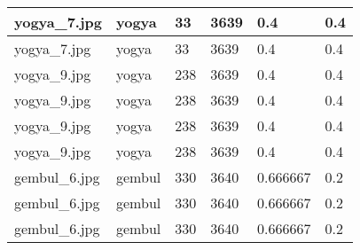 \begin{table}[H]
\begin{tabular}{|l|l|l|l|l|l|}
		yogya\_7.jpg                       & yogya                                    & 33                                           & 3639                                         & 0.4                                      & 0.4                                       \\ \hline
		yogya\_7.jpg                       & yogya                                    & 33                                           & 3639                                         & 0.4                                      & 0.4                                       \\ \hline
		yogya\_9.jpg                       & yogya                                    & 238                                          & 3639                                         & 0.4                                      & 0.4                                       \\ \hline
		yogya\_9.jpg                       & yogya                                    & 238                                          & 3639                                         & 0.4                                      & 0.4                                       \\ \hline
		yogya\_9.jpg                       & yogya                                    & 238                                          & 3639                                         & 0.4                                      & 0.4                                       \\ \hline
		yogya\_9.jpg                       & yogya                                    & 238                                          & 3639                                         & 0.4                                      & 0.4                                       \\ \hline
		gembul\_6.jpg                      & gembul                                   & 330                                          & 3640                                         & 0.666667                                 & 0.2                                       \\ \hline
		gembul\_6.jpg                      & gembul                                   & 330                                          & 3640                                         & 0.666667                                 & 0.2                                       \\ \hline
		gembul\_6.jpg                      & gembul                                   & 330                                          & 3640                                         & 0.666667                                 & 0.2                                       \\ \hline

\end{tabular}
\end{table}
